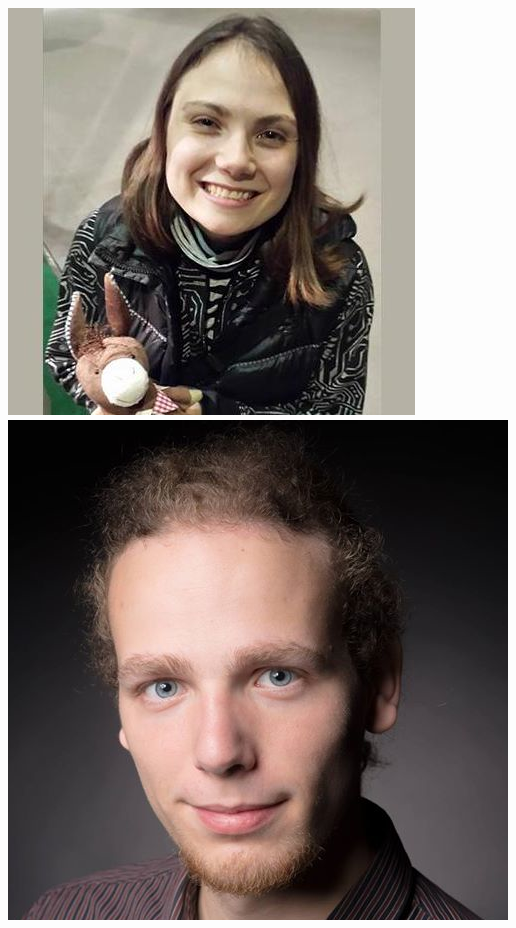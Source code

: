 \documentclass{beamer}
\begin{document}
\begin{frame}
\begin{columns}
\begin{columns}
\includegraphics[width=\textwidth]{Irina.jpg}
\includegraphics[width=\textwidth]{Valentin.png}

\end{columns}
\end{columns}
\end{frame}
\end{document}
